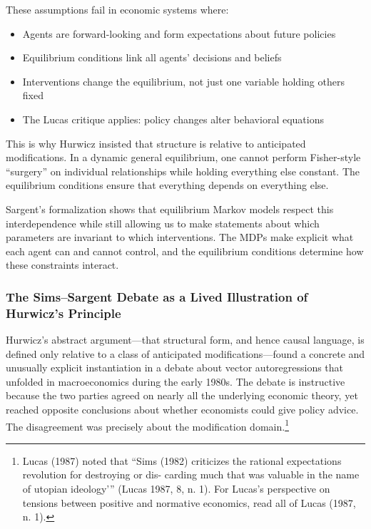 \documentclass[12pt]{article}
\begin{document}
These assumptions fail in economic systems where:
\begin{itemize}
\item Agents are forward-looking and form expectations about future policies
\item Equilibrium conditions link all agents' decisions and beliefs
\item Interventions change the equilibrium, not just one variable holding others fixed
\item The Lucas critique applies: policy changes alter behavioral equations
\end{itemize}

This is why Hurwicz insisted that structure is relative to anticipated modifications. In a dynamic general equilibrium, one cannot perform Fisher-style ``surgery'' on individual relationships while holding everything else constant. The equilibrium conditions ensure that everything depends on everything else.

Sargent's formalization shows that equilibrium Markov models respect this interdependence while still allowing us to make statements about which parameters are invariant to which interventions. The MDPs make explicit what each agent can and cannot control, and the equilibrium conditions determine how these constraints interact.




\subsubsection{The Sims--Sargent Debate as a Lived Illustration of Hurwicz's Principle}

Hurwicz's abstract argument---that structural form, and hence causal language, is defined
only relative to a class of anticipated modifications---found a concrete and unusually
explicit instantiation in a debate about vector autoregressions that unfolded in
macroeconomics during the early 1980s.  The debate is instructive because the two parties
agreed on nearly all the underlying economic theory, yet reached opposite conclusions about
whether economists could give policy advice.  The disagreement was precisely about the
modification domain.\footnote{Lucas (1987) noted that ``Sims (1982) criticizes the rational expectations revolution for destroying or dis-
carding much that was valuable in the name of utopian ideology’” (Lucas 1987, 8, n. 1).
For Lucas’s perspective on tensions between positive and normative economics, read all of Lucas (1987, n. 1).}
\end{document}
